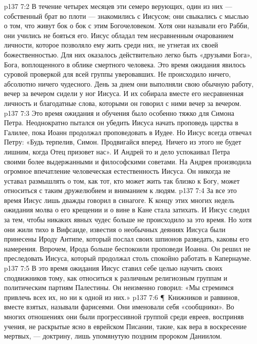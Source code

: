 \vs p137 7:2 В течение четырех месяцев эти семеро верующих, один из них --- собственный брат во плоти --- знакомились с Иисусом; они свыкались с мыслью о том, что живут бок о бок с этим Богочеловеком. Хотя они называли его Рабби, они учились не бояться его. Иисус обладал тем несравненным очарованием личности, которое позволяло ему жить среди них, не угнетая их своей божественностью. Для них оказалось действительно легко быть «друзьями Бога», Бога, воплощенного в облике смертного человека. Это время ожидания явилось суровой проверкой для всей группы уверовавших. Не происходило ничего, абсолютно ничего чудесного. День за днем они выполняли свою обычную работу, вечер за вечером сидели у ног Иисуса. И их собирала вместе его несравненная личность и благодатные слова, которыми он говорил с ними вечер за вечером.
\vs p137 7:3 Это время ожидания и обучения было особенно тяжко для Симона Петра. Неоднократно пытался он убедить Иисуса начать проповедь царства в Галилее, пока Иоанн продолжал проповедовать в Иудее. Но Иисус всегда отвечал Петру: «Будь терпелив, Симон. Продвигайся вперед. Ничего из этого не будет лишним, когда Отец призовет нас». И Андрей то и дело успокаивал Петра своими более выдержанными и философскими советами. На Андрея производила огромное впечатление человеческая естественность Иисуса. Он никогда не уставал размышлять о том, как тот, кто может жить так близко к Богу, может относиться с таким дружелюбием и вниманием к людям.
\vs p137 7:4 За все это время Иисус лишь дважды говорил в синагоге. К концу этих многих недель ожидания молва о его крещении и о вине в Кане стала затихать. И Иисус следил за тем, чтобы никаких явных чудес больше не происходило за это время. Но хотя они жили тихо в Вифсаиде, известия о необычных деяниях Иисуса были принесены Ироду Антипе, который послал своих шпионов разведать, каковы его намерения. Впрочем, Ирода больше беспокоили проповеди Иоанна. Он решил не преследовать Иисуса, который продолжал столь спокойно работать в Капернауме.
\vs p137 7:5 В это время ожидания Иисус ставил себе целью научить своих сподвижников тому, как относиться к различным религиозным группам и политическим партиям Палестины. Он неизменно говорил: «Мы стремимся привлечь всех их, но  ни к одной из них.»
\vs p137 7:6 \P\ Книжников и раввинов, вместе взятых, называли фарисеями. Они именовали себя «сообщники». Во многих отношениях они были прогрессивной группой среди евреев, восприняв учения, не раскрытые ясно в еврейском Писании, такие, как вера в воскресение мертвых, --- доктрину, лишь упомянутую поздним пророком Даниилом.
